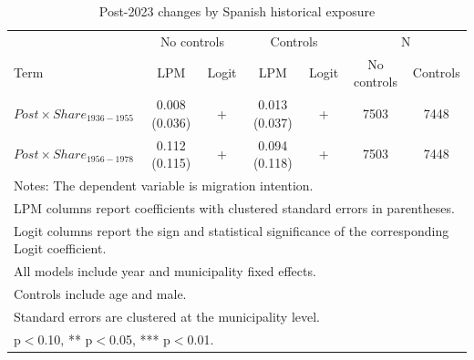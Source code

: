 \begin{table}[!htbp]
\centering
\caption{Post-2023 changes by Spanish historical exposure}
\label{tab:post_share_lpm_logit}
\small
\begin{tabular}{lcccccc}
\hline
 & \multicolumn{2}{c}{No controls} & \multicolumn{2}{c}{Controls} & \multicolumn{2}{c}{N} \\
Term & LPM & Logit & LPM & Logit & No controls & Controls \\
\hline
$Post \times Share_{1936-1955}$ & 0.008 (0.036) & + & 0.013 (0.037) & + & 7503 & 7448 \\
$Post \times Share_{1956-1978}$ & 0.112 (0.115) & + & 0.094 (0.118) & + & 7503 & 7448 \\
\hline
\multicolumn{7}{l}{\footnotesize Notes: The dependent variable is migration intention.} \\
\multicolumn{7}{l}{\footnotesize LPM columns report coefficients with clustered standard errors in parentheses.} \\
\multicolumn{7}{l}{\footnotesize Logit columns report the sign and statistical significance of the corresponding Logit coefficient.} \\
\multicolumn{7}{l}{\footnotesize All models include year and municipality fixed effects.} \\
\multicolumn{7}{l}{\footnotesize Controls include age and male.} \\
\multicolumn{7}{l}{\footnotesize Standard errors are clustered at the municipality level.} \\
\multicolumn{7}{l}{\footnotesize * p$<$0.10, ** p$<$0.05, *** p$<$0.01.} \\
\end{tabular}
\end{table}
